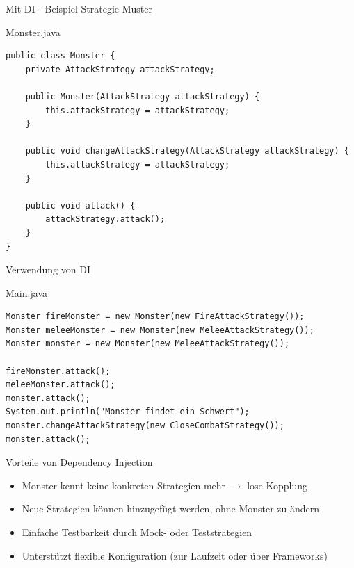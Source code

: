 \begin{frame}[fragile]{Mit DI - Beispiel Strategie-Muster}
	\begin{exampleblock}{Monster.java}
		\begin{lstlisting}
public class Monster {
	private AttackStrategy attackStrategy;
	
	public Monster(AttackStrategy attackStrategy) {
		this.attackStrategy = attackStrategy;
	}
	
	public void changeAttackStrategy(AttackStrategy attackStrategy) {
		this.attackStrategy = attackStrategy;
	}
	
	public void attack() {
		attackStrategy.attack();
	}
}
		\end{lstlisting}
	\end{exampleblock}
\end{frame}


\begin{frame}[fragile]{Verwendung von DI}
	\begin{exampleblock}{Main.java}
		\begin{lstlisting}
Monster fireMonster = new Monster(new FireAttackStrategy());
Monster meleeMonster = new Monster(new MeleeAttackStrategy());
Monster monster = new Monster(new MeleeAttackStrategy());

fireMonster.attack();  
meleeMonster.attack(); 
monster.attack();
System.out.println("Monster findet ein Schwert");
monster.changeAttackStrategy(new CloseCombatStrategy());
monster.attack();
		\end{lstlisting}
	\end{exampleblock}
\end{frame}

\begin{frame}{Vorteile von Dependency Injection}
	\begin{itemize}
	    \item Monster kennt keine konkreten Strategien mehr $\rightarrow$ lose Kopplung
	    \item Neue Strategien können hinzugefügt werden, ohne Monster zu ändern
	    \item Einfache Testbarkeit durch Mock- oder Teststrategien
	    \item Unterstützt flexible Konfiguration (zur Laufzeit oder über Frameworks)
	\end{itemize}
\end{frame}

